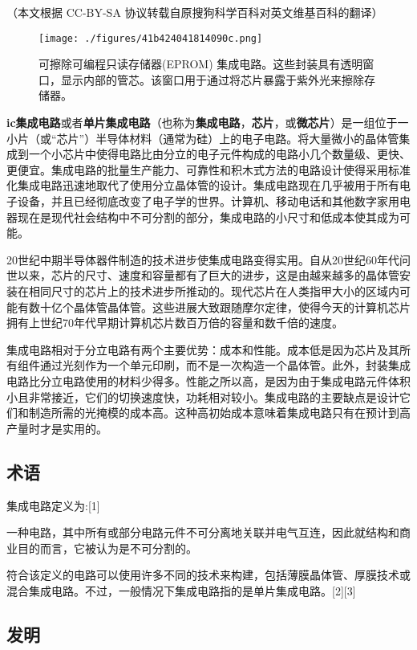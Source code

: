 
（本文根据 CC-BY-SA 协议转载自原搜狗科学百科对英文维基百科的翻译）

\begin{figure}[ht]
\centering
\texttt{[image: ./figures/41b424041814090c.png]}
\caption{可擦除可编程只读存储器(EPROM) 集成电路。这些封装具有透明窗口，显示内部的管芯。该窗口用于通过将芯片暴露于紫外光来擦除存储器。} \label{fig_icJCDL_1}
\end{figure}

\textbf{ic集成电路}或者\textbf{单片集成电路}（也称为\textbf{集成电路}，\textbf{芯片}，或\textbf{微芯片}）是一组位于一小片（或“芯片”）半导体材料（通常为硅）上的电子电路。将大量微小的晶体管集成到一个小芯片中使得电路比由分立的电子元件构成的电路小几个数量级、更快、更便宜。集成电路的批量生产能力、可靠性和积木式方法的电路设计使得采用标准化集成电路迅速地取代了使用分立晶体管的设计。集成电路现在几乎被用于所有电子设备，并且已经彻底改变了电子学的世界。计算机、移动电话和其他数字家用电器现在是现代社会结构中不可分割的部分，集成电路的小尺寸和低成本使其成为可能。

20世纪中期半导体器件制造的技术进步使集成电路变得实用。自从20世纪60年代问世以来，芯片的尺寸、速度和容量都有了巨大的进步，这是由越来越多的晶体管安装在相同尺寸的芯片上的技术进步所推动的。现代芯片在人类指甲大小的区域内可能有数十亿个晶体管晶体管。这些进展大致跟随摩尔定律，使得今天的计算机芯片拥有上世纪70年代早期计算机芯片数百万倍的容量和数千倍的速度。

集成电路相对于分立电路有两个主要优势：成本和性能。成本低是因为芯片及其所有组件通过光刻作为一个单元印刷，而不是一次构造一个晶体管。此外，封装集成电路比分立电路使用的材料少得多。性能之所以高，是因为由于集成电路元件体积小且非常接近，它们的切换速度快，功耗相对较小。集成电路的主要缺点是设计它们和制造所需的光掩模的成本高。这种高初始成本意味着集成电路只有在预计到高产量时才是实用的。

\subsection{术语}

集成电路定义为:[1]

一种电路，其中所有或部分电路元件不可分离地关联并电气互连，因此就结构和商业目的而言，它被认为是不可分割的。

符合该定义的电路可以使用许多不同的技术来构建，包括薄膜晶体管、厚膜技术或混合集成电路。不过，一般情况下集成电路指的是单片集成电路。[2][3]

\subsection{发明}

